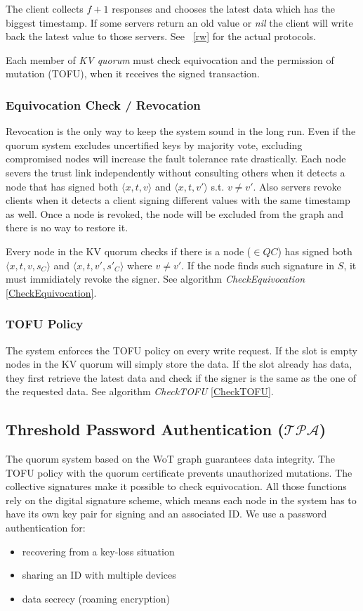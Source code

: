 The client collects $f + 1$ responses and chooses the latest data which
has the biggest timestamp. If some servers return an old value or {\em
  nil} the client will write back the latest value to those servers.
\ifdefined\ABSTRACT
\else
See ~\ref{rw} for the actual protocols.
\fi

Each member of {\em KV quorum} must check equivocation and the
permission of mutation (TOFU), when it receives the signed
transaction.

\subsubsection*{Equivocation Check / Revocation}
Revocation is the only way to keep the system sound in the long
run. Even if the quorum system excludes uncertified keys by majority
vote, excluding compromised nodes will increase the fault tolerance
rate drastically.
Each node severs the trust link independently without consulting
others when it detects a node that has signed both $\langle x,t,v
\rangle$ and $\langle x,t,v' \rangle$ s.t.  $v \neq v'$. Also servers
revoke clients when it detects a client signing different values with
the same timestamp as well. Once a node is revoked, the node will be
excluded from the graph and there is no way to restore it.

Every node in the KV quorum checks if there is a node ($\in QC$) has
signed both $\langle x, t, v, s_C \rangle$ and $\langle x, t, v', s'_C
\rangle$ where $v \neq v'$.
If the node finds such signature in $S$, it must immidiately revoke
the signer.
See algorithm {\em CheckEquivocation} \ref {CheckEquivocation}.

\subsubsection*{TOFU Policy}
The system enforces the TOFU policy on every write request. If the
slot is empty nodes in the KV quorum will simply store the data. If
the slot already has data, they first retrieve the latest data and
check if the signer is the same as the one of the requested data.
See algorithm {\em CheckTOFU} \ref{CheckTOFU}.

\subsection{Threshold Password Authentication ($\mathcal{TPA}$)}
\label{threshold}
The quorum system based on the WoT graph guarantees data
integrity. The TOFU policy with the quorum certificate prevents
unauthorized mutations. The collective signatures make it possible to
check equivocation. All those functions rely on the digital signature
scheme, which means each node in the system has to have its own key
pair for signing and an associated ID. We use a password
authentication for:
\begin{itemize}
\item recovering from a key-loss situation
\item sharing an ID with multiple devices
\item data secrecy (roaming encryption)
\end{itemize}

